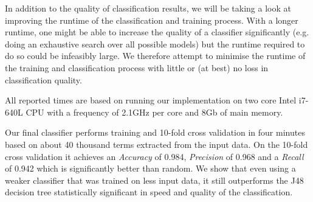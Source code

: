 In addition to the quality of classification results, we will be taking a look at improving the runtime of the classification and training process.
With a longer runtime, one might be able to increase the quality of a classifier  significantly (e.g. doing an exhaustive search over all possible models) but the runtime required to do so could be infeasibly large. We therefore attempt to minimise the runtime of the training and classification process with little or (at best) no loss in classification quality.

All reported times are based on running our implementation on two core Intel i7-640L CPU with a frequency of 2.1GHz per core and 8Gb of main memory.

Our final classifier performs training and 10-fold cross validation in four minutes based on about 40 thousand terms extracted from the input data.
On the 10-fold cross validation it achieves an \emph{Accuracy} of 0.984, \emph{Precision} of 0.968 and a \emph{Recall} of 0.942 which is significantly better than random.
We show that even using a weaker classifier that was trained on less input data, it still outperforms the J48 decision tree statistically significant in speed and quality of the classification.

